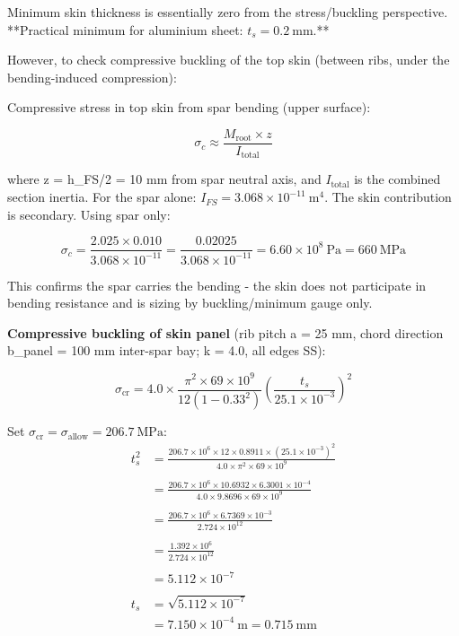 \documentclass[10pt,a4paper]{article}
\begin{document}
Minimum skin thickness is essentially zero from the stress/buckling perspective. **Practical minimum for aluminium sheet: $t_s = 0.2\ \text{mm}$.**

However, to check compressive buckling of the top skin (between ribs, under the bending-induced compression):

Compressive stress in top skin from spar bending (upper surface):

\[
\sigma_c \approx \frac{M_{\text{root}} \times z}{I_{\text{total}}}
\]

where z = h\_FS/2 = 10 mm from spar neutral axis, and $I_{\text{total}}$ is the combined section inertia. For the spar alone: $I_{FS} = 3.068 \times 10^{-11}\ \text{m}^4$. The skin contribution is secondary. Using spar only:

\[
\sigma_c = \frac{2.025 \times 0.010}{3.068 \times 10^{-11}} = \frac{0.02025}{3.068 \times 10^{-11}} = 6.60 \times 10^8\ \text{Pa} = 660\ \text{MPa}
\]

This confirms the spar carries the bending - the skin does not participate in bending resistance and is sizing by buckling/minimum gauge only.

\textbf{Compressive buckling of skin panel} (rib pitch a = 25 mm, chord direction b\_panel = 100 mm inter-spar bay; k = 4.0, all edges SS):

\[
\sigma_{\text{cr}} = 4.0 \times \frac{\pi^2 \times 69 \times 10^9}{12(1-0.33^2)} \left(\frac{t_s}{25.1 \times 10^{-3}}\right)^2
\]

Set $\sigma_{\text{cr}} = \sigma_{\text{allow}} = 206.7\ \text{MPa}$:
\begin{align*}
t_s^2 &= \frac{206.7 \times 10^6 \times 12 \times 0.8911 \times (25.1 \times 10^{-3})^2}{4.0 \times \pi^2 \times 69 \times 10^9} \\
\\
&= \frac{206.7 \times 10^6 \times 10.6932 \times 6.3001 \times 10^{-4}}{4.0 \times 9.8696 \times 69 \times 10^9} \\
\\
&= \frac{206.7 \times 10^6 \times 6.7369 \times 10^{-3}}{2.724 \times 10^{12}} \\
\\
&= \frac{1.392 \times 10^6}{2.724 \times 10^{12}} \\
\\
&= 5.112 \times 10^{-7} \\
\\
t_s &= \sqrt{5.112 \times 10^{-7}} \\
&= 7.150 \times 10^{-4}\ \text{m} = 0.715\ \text{mm}
\end{align*}
\end{document}

